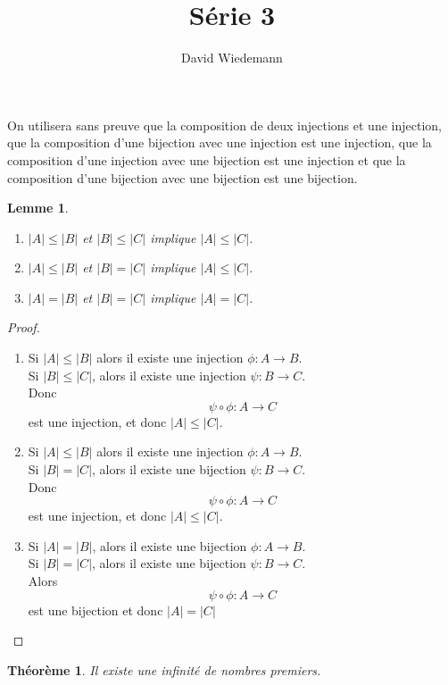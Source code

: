\documentclass[11pt, a4paper]{article}
\newtheorem{theorem}{Théorème}
\newtheorem{lemma}{Lemme}
\begin{document}
\title{Série 3}
\author{David Wiedemann}
\maketitle
On utilisera sans preuve que la composition de deux injections et une injection, que la composition d'une bijection avec une injection est une injection, que la composition d'une injection avec une bijection est une injection et que la composition d'une bijection avec une bijection est une bijection.\\
\begin{lemma}
	$ $\\
	\begin{enumerate}
		\item $|A| \leq |B|$ et $|B| \leq |C|$ implique $|A| \leq |C|$.
		\item $|A| \leq |B|$ et $|B| = |C|$ implique $|A| \leq |C|$.
		\item $|A| = |B|$ et $|B| = |C|$ implique $|A| = |C|$.
	\end{enumerate}
\end{lemma}
\begin{proof}
	\begin{enumerate}
		\item Si $|A| \leq |B|$ alors il existe une injection  $\phi: A \to B$.\\
		Si $|B| \leq |C|$, alors il existe une injection $\psi:B \to C$.\\
		Donc 
		\[ 
			\psi \circ \phi : A \to C
		\]
		est une injection, et donc
		$|A| \leq |C|$.
	\item Si $|A| \leq |B|$ alors il existe une injection  $\phi: A \to B$.\\
	Si $|B| = |C|$, alors il existe une bijection $\psi:B \to C$.\\
	Donc
		\[ 
			\psi \circ \phi : A \to C
		\]
		est une injection, et donc $|A| \leq |C|$.
	\item Si $|A| = |B|$, alors il existe une bijection  $\phi: A \to B$.\\
	 Si $|B| = |C|$, alors il existe une bijection  $\psi: B \to C$.\\
	 Alors
	 \[ 
	 \psi \circ \phi : A \to C
	 \]
	 est une bijection et donc $|A| = |C|$
	 
	 
		
	\end{enumerate}
\end{proof}


\begin{theorem}
	Il existe une infinité de nombres premiers.
\end{theorem}
\end{document}
